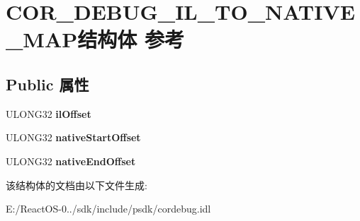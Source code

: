 \hypertarget{struct_c_o_r___d_e_b_u_g___i_l___t_o___n_a_t_i_v_e___m_a_p}{}\section{C\+O\+R\+\_\+\+D\+E\+B\+U\+G\+\_\+\+I\+L\+\_\+\+T\+O\+\_\+\+N\+A\+T\+I\+V\+E\+\_\+\+M\+A\+P结构体 参考}
\label{struct_c_o_r___d_e_b_u_g___i_l___t_o___n_a_t_i_v_e___m_a_p}
\subsection*{Public 属性}
\begin{DoxyCompactItemize}
\item 
\mbox{\label{struct_c_o_r___d_e_b_u_g___i_l___t_o___n_a_t_i_v_e___m_a_p_af14a89ce43f9effab3fe370ea14af299}} 
U\+L\+O\+N\+G32 {\bfseries il\+Offset}
\item 
\mbox{\label{struct_c_o_r___d_e_b_u_g___i_l___t_o___n_a_t_i_v_e___m_a_p_a32937bef32e9980c3da058662e43de3a}} 
U\+L\+O\+N\+G32 {\bfseries native\+Start\+Offset}
\item 
\mbox{\label{struct_c_o_r___d_e_b_u_g___i_l___t_o___n_a_t_i_v_e___m_a_p_a9a70fb3fe174b45a9f8fa1a71de5ef70}} 
U\+L\+O\+N\+G32 {\bfseries native\+End\+Offset}
\end{DoxyCompactItemize}


该结构体的文档由以下文件生成\+:\begin{DoxyCompactItemize}
\item 
E\+:/\+React\+O\+S-\/0../sdk/include/psdk/cordebug.\+idl\end{DoxyCompactItemize}
